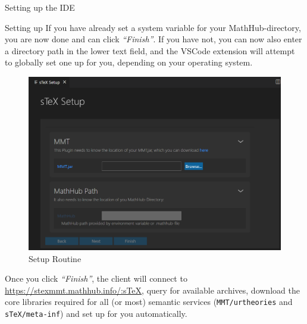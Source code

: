 \begin{sfragment}{Setting up the \sTeX IDE}
\begin{sfragment}{Setting up \mmt}
      If you have already set a system variable for your MathHub-directory,
      you are now done and can click \emph{``Finish''}. If you have not,
      you can now also enter a directory path in the lower text field,
      and the VSCode extension will attempt to globally set one up
      for you, depending on your operating system.
  
      \begin{figure}
        \begin{center}
          \includegraphics[width=\textwidth]{img/vsc2.png}
        \end{center}
        \caption{\sTeX Setup Routine}\label{fig:setup}
      \end{figure}

      Once you click \emph{``Finish''}, the client will connect
      to \url{https://stexmmt.mathhub.info/:sTeX}, query for
      available archives, download the core libraries required
      for all (or most) semantic services (\texttt{MMT/urtheories}
      and \texttt{sTeX/meta-inf}) and set up \RusTeX for you 
      automatically.
  
    \end{sfragment}
  
  \end{sfragment}
